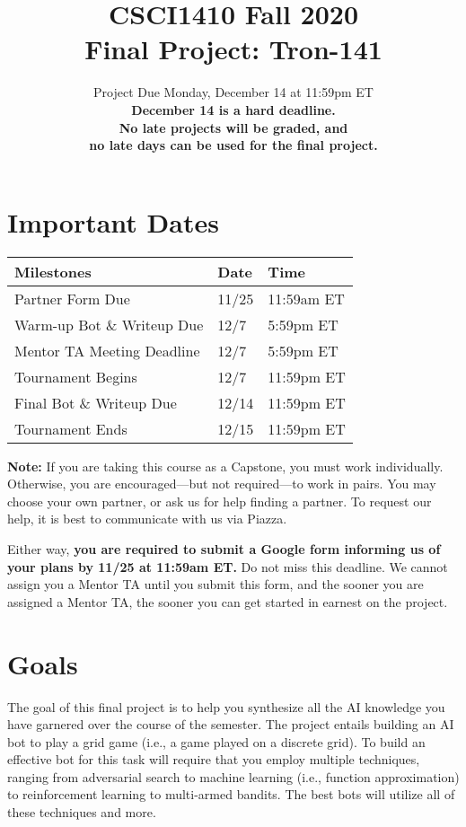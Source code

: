 \documentclass{article}
\title{CSCI1410 Fall 2020 \\
Final Project: Tron-141}
\date{Project Due Monday, December 14 at 11:59pm ET \\ [1ex]
  \textbf{December 14 is a hard deadline. \\
    No late projects will be graded, and \\
    no late days can be used for the final project. \\}}
\begin{document}
\maketitle


\section{Important Dates}

\begin{center}
\begin{tabular}{|l||l|l|}
\hline    
Milestones & Date & Time \\
\hline    
\hline    
Partner Form Due                 & 11/25 & 11:59am ET \\
Warm-up Bot \& Writeup Due       & 12/7  & 5:59pm ET \\ 
Mentor TA Meeting Deadline       & 12/7  & 5:59pm ET \\ 
Tournament Begins                & 12/7  & 11:59pm ET \\
Final Bot \& Writeup Due         & 12/14 & 11:59pm ET \\
Tournament Ends                  & 12/15 & 11:59pm ET \\
\hline    
\end{tabular}
\end{center}

\textbf{Note:} If you are taking this course as a Capstone, you must work individually.
Otherwise, you are encouraged---but not required---to work in pairs.
You may choose your own partner, or ask us for help finding a partner.
To request our help, it is best to communicate with us via Piazza.

Either way, \textbf{you are required to submit a Google form informing
  us of your plans by 11/25 at 11:59am ET.}  Do not miss this
deadline.  We cannot assign you a Mentor TA until you submit this
form, and the sooner you are assigned a Mentor TA, the sooner you can
get started in earnest on the project.


\section{Goals}
The goal of this final project is to help you synthesize all the AI
knowledge you have garnered over the course of the semester.  The
project entails building an AI bot to play a grid game (i.e., a game
played on a discrete grid).  To build an effective bot for this task
will require that you employ multiple techniques, ranging from
adversarial search to machine learning (i.e., function approximation)
to reinforcement learning to multi-armed bandits.  The best bots will
utilize all of these techniques and more.
\end{document}
